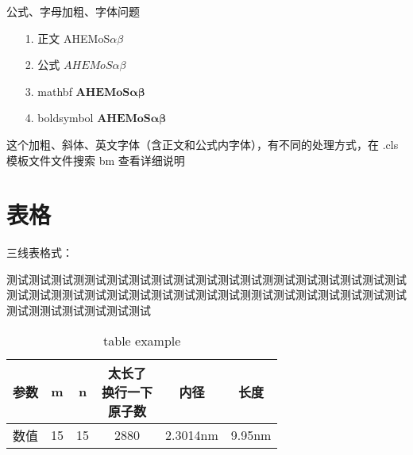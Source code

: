 \documentclass[AutoFakeBold]{LZUThesis-PgD&PhD}
\begin{document}
公式、字母加粗、字体问题

\begin{itemize}
  \item[1.] 正文 \qquad \quad AHEMoS$\alpha \beta$
  \item[2.] 公式 \qquad \quad $AHEMoS \alpha \beta$
  \item[3.] mathbf \qquad $\mathbf{AHEMoS\alpha \beta}$
  \item[4.] boldsymbol $\boldsymbol{AHEMoS\alpha \beta}$
\end{itemize}

这个加粗、斜体、英文字体（含正文和公式内字体），有不同的处理方式，在 .cls 模板文件文件搜索 bm 查看详细说明



\section{表格}

三线表格式：

测试测试测试测测试测试测试测试测试测试测试测试测测试测试测试测试测试测试测试测试测测试测试测试测试测试测试测试测试测测试测试测试测试测试测试测试测试测测试测试测试测试测试


\begin{table}[hbt!]\label{tbl:mole}
  \centering
  \begin{tabular*}{0.9\textwidth}{@{\extracolsep{\fill}}cccccc}
    \toprule
        参数& m & n & \tabincell{c}{太长了\\换行一下\\原子数}  & 内径 & 长度\\
    \midrule
    数值 & 15 & 15  & 2880 & 2.3014nm & 9.95nm \\
    \bottomrule
  \end{tabular*}
  \caption{table example}
\end{table}
\end{document}
